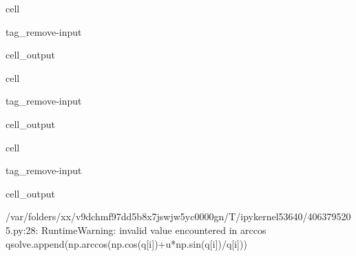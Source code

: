 \documentclass[letterpaper,10pt,english]{jupyterBook}
\begin{document}
\begin{sphinxuseclass}{cell}
\begin{sphinxuseclass}{tag_remove-input}\begin{sphinxVerbatimOutput}

\begin{sphinxuseclass}{cell_output}
\noindent{}

\end{sphinxuseclass}\end{sphinxVerbatimOutput}

\end{sphinxuseclass}
\end{sphinxuseclass}
\begin{sphinxuseclass}{cell}
\begin{sphinxuseclass}{tag_remove-input}\begin{sphinxVerbatimOutput}

\begin{sphinxuseclass}{cell_output}
\noindent{}

\end{sphinxuseclass}\end{sphinxVerbatimOutput}

\end{sphinxuseclass}
\end{sphinxuseclass}
\begin{sphinxuseclass}{cell}
\begin{sphinxuseclass}{tag_remove-input}\begin{sphinxVerbatimOutput}

\begin{sphinxuseclass}{cell_output}
\begin{sphinxVerbatim}[commandchars=\\\{\}]
/var/folders/xx/v9dchmf97dd5b8x7jswjw5yc0000gn/T/ipykernel\PYGZus{}53640/4063795205.py:28: RuntimeWarning: invalid value encountered in arccos
  qsolve.append(np.arccos(np.cos(q[i])+u*np.sin(q[i])/q[i]))
\end{sphinxVerbatim}

\end{sphinxuseclass}\end{sphinxVerbatimOutput}

\end{sphinxuseclass}
\end{sphinxuseclass}
\end{document}
